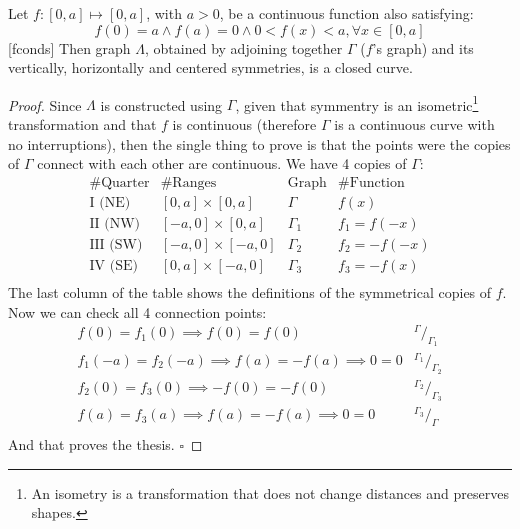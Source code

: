 \documentclass{layout}
\begin{document}
\begin{lemma}
\label{lem:lclosed}
Let $f:[0,a] \mapsto [0,a]$, with $a > 0$, be a continuous function also satisfying:
\begin{equation}
f(0)=a \wedge f(a)=0 \wedge 0 < f(x) < a, \forall x \in [0,a]
\end{equation}[fconds]
Then graph $\Lambda$, obtained by adjoining together $\Gamma$ ($f$'s graph) and
its vertically, horizontally and centered symmetries, is a closed curve.
\begin{proof}
Since $\Lambda$ is constructed using $\Gamma$, given that symmentry is an 
isometric\footnote{An isometry is a transformation that does not change distances and
preserves shapes.} 
transformation and that $f$ is continuous (therefore $\Gamma$ is a continuous curve
with no interruptions), then the single thing to prove is that the points were
the copies of $\Gamma$ connect with each other are continuous. We have 4
copies of $\Gamma$:
\begin{equation*}
\begin{array}{c|c|c|c}
\text{\# Quarter} & \text{\# Ranges} & \text{Graph} & \text{\# Function} \\
\hline
\text{I (NE)} & [0,a] \times [0,a] & \Gamma & f(x) \\
\text{II (NW)} & [-a,0] \times [0,a] & \Gamma_1 & f_1 = f(-x) \\
\text{III (SW)} & [-a,0] \times [-a,0] & \Gamma_2 & f_2 = -f(-x) \\
\text{IV (SE)} & [0,a] \times [-a,0] & \Gamma_3 & f_3 = -f(x) \\
\end{array}
\end{equation*}
The last column of the table shows the definitions of the symmetrical copies of $f$.
Now we can check all 4 connection points:
\begin{equation}\label{eq:symms}
\begin{array}{l|c}
f(0) = f_1(0) \implies f(0) = f(0) & ^{\Gamma}/_{\Gamma_1} \\
f_1(-a) = f_2(-a) \implies f(a) = -f(a) \implies 0 = 0 & ^{\Gamma_1}/_{\Gamma_2} \\
f_2(0) = f_3(0) \implies -f(0) = -f(0) & ^{\Gamma_2}/_{\Gamma_3} \\
f(a) = f_3(a) \implies f(a) = -f(a) \implies 0 = 0 & ^{\Gamma_3}/_{\Gamma} \\
\end{array}
\end{equation}
And that proves the thesis.
$\square$
\end{proof}
\end{lemma}
\end{document}
